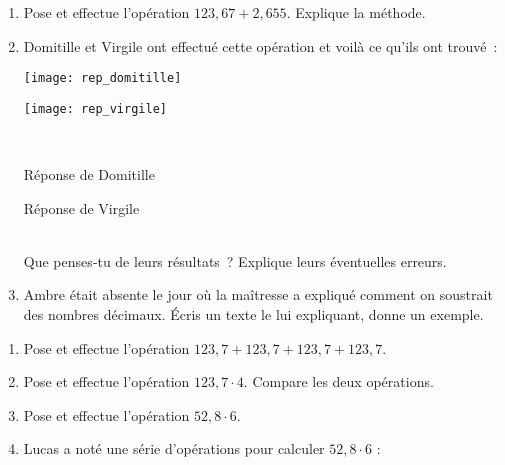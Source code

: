\begin{activite}

\begin{partie}
\begin{enumerate}
 \item Pose et effectue l'opération $123,67 + 2,655$. Explique la méthode.
 \item Domitille et Virgile ont effectué cette opération et voilà ce qu'ils ont trouvé :\\[0.5em]
 
 \begin{minipage}[t]{.44\linewidth} 
\texttt{[image: rep\_domitille]}
 \end{minipage}\hfill%
 \begin{minipage}[t]{.56\linewidth}
\texttt{[image: rep\_virgile]}
 \end{minipage}\\
  \begin{minipage}[t]{.44\linewidth} 
\begin{center} Réponse de Domitille \end{center}
 \end{minipage}\hfill%
 \begin{minipage}[t]{.56\linewidth}
\begin{center} Réponse de Virgile \end{center}
 \end{minipage}\\
 
 Que penses‑tu de leurs résultats ? Explique leurs éventuelles erreurs.
 \item Ambre était absente le jour où la maîtresse a expliqué comment on soustrait des nombres décimaux. Écris un texte le lui expliquant, donne un exemple.
 \end{enumerate}
\end{partie}

\begin{partie}
\begin{enumerate}
 \item Pose et effectue l'opération $123,7 + 123,7 + 123,7 + 123,7$.
 \item Pose et effectue l'opération $123,7 \cdot 4$. Compare les deux opérations.
 \item Pose et effectue l'opération $52,8 \cdot 6$.
 \item Lucas a noté une série d'opérations pour calculer $52,8 \cdot 6$ : \\[-1em]
 

\end{enumerate}
\end{partie}
\end{activite}
